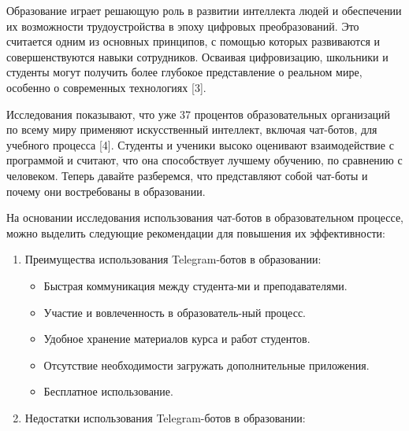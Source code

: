 \begin{multicols}{2}
Образование играет решающую роль в развитии интеллекта людей и
обеспечении их возможности трудоустройства в эпоху цифровых
преобразований. Это считается одним из основных принципов, с помощью
которых развиваются и совершенствуются навыки сотрудников. Осваивая
цифровизацию, школьники и студенты могут получить более глубокое
представление о реальном мире, особенно о современных технологиях
{[}3{]}.

Исследования показывают, что уже 37 процентов образовательных
организаций по всему миру применяют искусственный интеллект, включая
чат-ботов, для учебного процесса {[}4{]}. Студенты и ученики высоко
оценивают взаимодействие с программой и считают, что она способствует
лучшему обучению, по сравнению с человеком. Теперь давайте разберемся,
что представляют собой чат-боты и почему они востребованы в образовании.

На основании исследования использования чат-ботов в образовательном
процессе, можно выделить следующие рекомендации для повышения их
эффективности:

\begin{enumerate}
\def\labelenumi{\arabic{enumi}.}
\setlength{\itemindent}{1cm}
\item
  Преимущества использования Telegram-ботов в образовании:

  \begin{itemize}
    \setlength{\itemindent}{1cm}
  \item
    Быстрая коммуникация между студента-ми и преподавателями.
  \item
    Участие и вовлеченность в образователь-ный процесс.
  \item
    Удобное хранение материалов курса и работ студентов.
  \item
    Отсутствие необходимости загружать дополнительные приложения.
  \item
    Бесплатное использование.
  \end{itemize}
\item
  Недостатки использования Telegram-ботов в образовании:


\end{enumerate}
\end{multicols}
